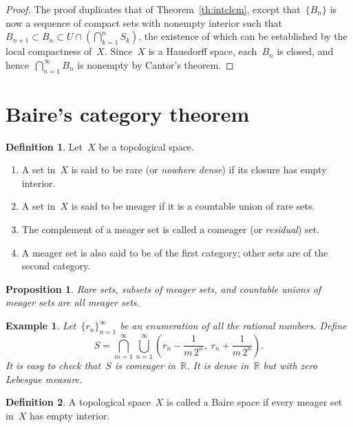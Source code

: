 \documentclass[11pt,a4paper]{article}  %
\newtheorem{proposition}{Proposition}[section]
\newtheorem{example}{Example}[section]
\theoremstyle{definition}
\newtheorem{definition}{Definition}[section]
\def\real{\mathbb{R}}
\numberwithin{equation}{section}
\begin{document}
\begin{proof}
  The proof duplicates that of Theorem~\ref{th:intclcm}, except that~$\{B_n\}$ is now a sequence of
  compact sets with nonempty interior such that
  $B_{n+1} \subset B_n \subset U \cap (\bigcap_{k=1}^n S_k)$, the existence of which can be
 established by the local compactness of~$X$.  Since~$X$ is a Hausdorff space, each~$B_n$ is closed,
 and hence~$\bigcap_{n=1}^\infty B_n$ is nonempty by Cantor's theorem.
\end{proof}

\section{Baire's category theorem}

\begin{definition}
Let~$X$ be a topological space.
\begin{enumerate}
  \item A set in~$X$ is said to be rare (or \emph{nowhere dense}) if its closure has empty interior.
  \item A set in~$X$ is said to be meager if it is a countable union of rare sets.
  \item The complement of a meager set is called a comeager (or \emph{residual}) set.
  \item A meager set is also said to be of the first category; other sets are
    of the second category.
\end{enumerate}
\end{definition}


\begin{proposition}
 Rare sets, subsets of meager sets, and countable unions of meager sets are all meager sets.
\end{proposition}

\begin{example}
  Let~$\{r_n\}_{n=1}^\infty$ be an enumeration of all the rational numbers.
  Define
  \begin{equation*}
    S = \bigcap_{m=1}^\infty \bigcup_{n=1}^\infty \left(r_n - \frac{1}{m\,2^n},\;
    r_n+\frac{1}{m\,2^n}\right).
  \end{equation*}
  It is easy to check that~$S$ is comeager in~$\real$. It is dense in~$\real$ but with zero Lebesgue measure.
\end{example}


\begin{definition}
  A topological space~$X$ is called a Baire space if every meager set in~$X$ has empty interior.
\end{definition}
\end{document}
